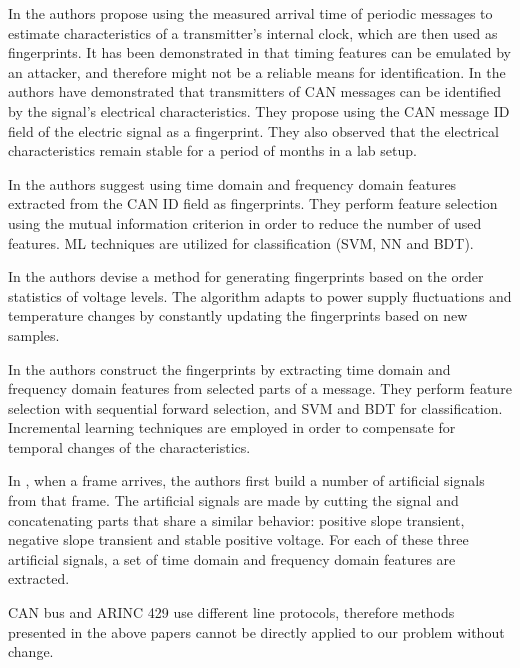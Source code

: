 \documentclass[conference]{IEEEtran}
\begin{document}
  
  In \cite{cho2016fingerprinting} the authors propose using the measured arrival time of periodic messages to estimate characteristics of a transmitter's internal clock, which are then used as fingerprints. It has been demonstrated in \cite{sagong2018cloaking} that timing features can be emulated by an attacker, and therefore might not be a reliable means for identification.
  In \cite{murvay2014source} the authors have demonstrated that transmitters of CAN messages can be identified by the signal's electrical characteristics. They propose using the CAN message ID field of the electric signal as a fingerprint. They also observed that the electrical characteristics remain stable for a period of months in a lab setup.
  
  In \cite{choi2018identifying} the authors suggest using time domain and frequency domain features extracted from the CAN ID field as fingerprints. They perform feature selection using the mutual information criterion in order to reduce the number of used features. ML techniques are utilized for classification (SVM, NN and BDT).
  
  In \cite{cho2017viden} the authors devise a method for generating fingerprints based on the order statistics of voltage levels. The algorithm adapts to power supply fluctuations and temperature changes by constantly updating the fingerprints based on new samples.
  
  In \cite{choi2018voltageids} the authors construct the fingerprints by extracting time domain and frequency domain features from selected parts of a message. They perform feature selection with sequential forward selection, and SVM and BDT for classification. Incremental learning techniques \cite{diehl2003svm} are employed in order to compensate for temporal changes of the characteristics.
  
  In \cite{kneib2018scission}, when a frame arrives, the authors first build a number of artificial signals from that frame. The artificial signals are made by cutting the signal and concatenating parts that share a similar behavior: positive slope transient, negative slope transient and stable positive voltage. For each of these three artificial signals, a set of time domain and frequency domain features are extracted.
  
  CAN bus and ARINC 429 use different line protocols, therefore methods presented in the above papers cannot be directly applied to our problem without change.
  
\end{document}
